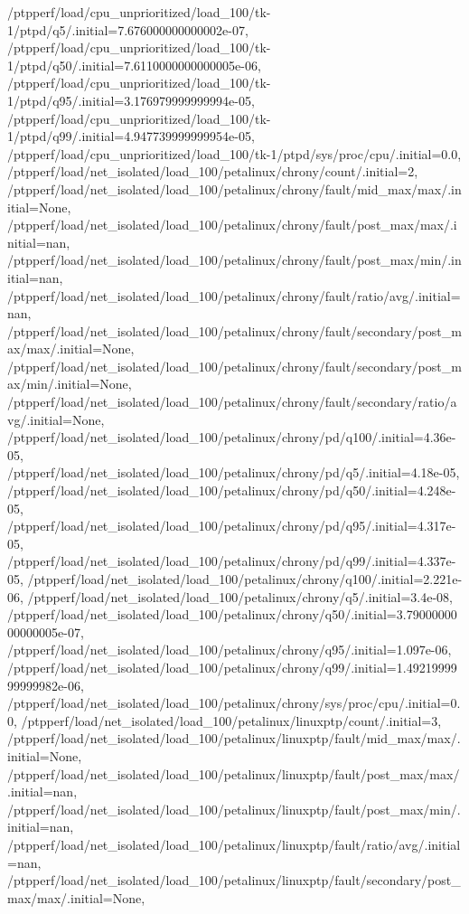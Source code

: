 {    /ptpperf/load/cpu_unprioritized/load_100/tk-1/ptpd/q5/.initial=7.676000000000002e-07,
    /ptpperf/load/cpu_unprioritized/load_100/tk-1/ptpd/q50/.initial=7.6110000000000005e-06,
    /ptpperf/load/cpu_unprioritized/load_100/tk-1/ptpd/q95/.initial=3.176979999999994e-05,
    /ptpperf/load/cpu_unprioritized/load_100/tk-1/ptpd/q99/.initial=4.947739999999954e-05,
    /ptpperf/load/cpu_unprioritized/load_100/tk-1/ptpd/sys/proc/cpu/.initial=0.0,
    /ptpperf/load/net_isolated/load_100/petalinux/chrony/count/.initial=2,
    /ptpperf/load/net_isolated/load_100/petalinux/chrony/fault/mid_max/max/.initial=None,
    /ptpperf/load/net_isolated/load_100/petalinux/chrony/fault/post_max/max/.initial=nan,
    /ptpperf/load/net_isolated/load_100/petalinux/chrony/fault/post_max/min/.initial=nan,
    /ptpperf/load/net_isolated/load_100/petalinux/chrony/fault/ratio/avg/.initial=nan,
    /ptpperf/load/net_isolated/load_100/petalinux/chrony/fault/secondary/post_max/max/.initial=None,
    /ptpperf/load/net_isolated/load_100/petalinux/chrony/fault/secondary/post_max/min/.initial=None,
    /ptpperf/load/net_isolated/load_100/petalinux/chrony/fault/secondary/ratio/avg/.initial=None,
    /ptpperf/load/net_isolated/load_100/petalinux/chrony/pd/q100/.initial=4.36e-05,
    /ptpperf/load/net_isolated/load_100/petalinux/chrony/pd/q5/.initial=4.18e-05,
    /ptpperf/load/net_isolated/load_100/petalinux/chrony/pd/q50/.initial=4.248e-05,
    /ptpperf/load/net_isolated/load_100/petalinux/chrony/pd/q95/.initial=4.317e-05,
    /ptpperf/load/net_isolated/load_100/petalinux/chrony/pd/q99/.initial=4.337e-05,
    /ptpperf/load/net_isolated/load_100/petalinux/chrony/q100/.initial=2.221e-06,
    /ptpperf/load/net_isolated/load_100/petalinux/chrony/q5/.initial=3.4e-08,
    /ptpperf/load/net_isolated/load_100/petalinux/chrony/q50/.initial=3.7900000000000005e-07,
    /ptpperf/load/net_isolated/load_100/petalinux/chrony/q95/.initial=1.097e-06,
    /ptpperf/load/net_isolated/load_100/petalinux/chrony/q99/.initial=1.4921999999999982e-06,
    /ptpperf/load/net_isolated/load_100/petalinux/chrony/sys/proc/cpu/.initial=0.0,
    /ptpperf/load/net_isolated/load_100/petalinux/linuxptp/count/.initial=3,
    /ptpperf/load/net_isolated/load_100/petalinux/linuxptp/fault/mid_max/max/.initial=None,
    /ptpperf/load/net_isolated/load_100/petalinux/linuxptp/fault/post_max/max/.initial=nan,
    /ptpperf/load/net_isolated/load_100/petalinux/linuxptp/fault/post_max/min/.initial=nan,
    /ptpperf/load/net_isolated/load_100/petalinux/linuxptp/fault/ratio/avg/.initial=nan,
    /ptpperf/load/net_isolated/load_100/petalinux/linuxptp/fault/secondary/post_max/max/.initial=None,
}

